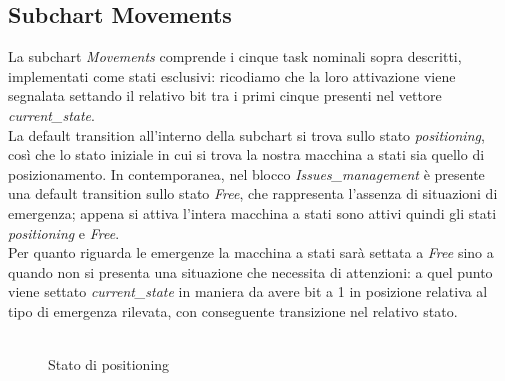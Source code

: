 \documentclass{article}
\begin{document}
        \subsection{Subchart Movements}

            La subchart  \emph{Movements} comprende i cinque task nominali sopra descritti, implementati come stati esclusivi: ricodiamo che la loro attivazione viene
            segnalata settando il relativo bit tra i primi cinque presenti nel vettore \emph{current\_state}.
            \\
            La default transition all'interno della subchart si trova 
            sullo stato \emph{positioning}, così che lo stato iniziale in cui si trova la nostra macchina a stati sia quello di posizionamento. In contemporanea, 
            nel blocco  \emph{Issues\_management} è presente una default transition sullo stato \emph{Free}, che rappresenta l'assenza di situazioni di emergenza;
            appena si attiva l'intera macchina a stati sono attivi quindi gli stati \emph{positioning} e \emph{Free}. \\
            Per quanto riguarda le emergenze la macchina a stati sarà settata a \emph{Free} sino a quando non si presenta una situazione che necessita di attenzioni:
            a quel punto viene settato \emph{current\_state} in maniera da avere bit a 1 in posizione relativa al 
            tipo di emergenza rilevata, con conseguente transizione nel relativo stato.\\
            \\
            
            \begin{figure} [ht]
                \caption{Stato di positioning}
                \label{fig:positioning}
            \end{figure}
                
\end{document}

